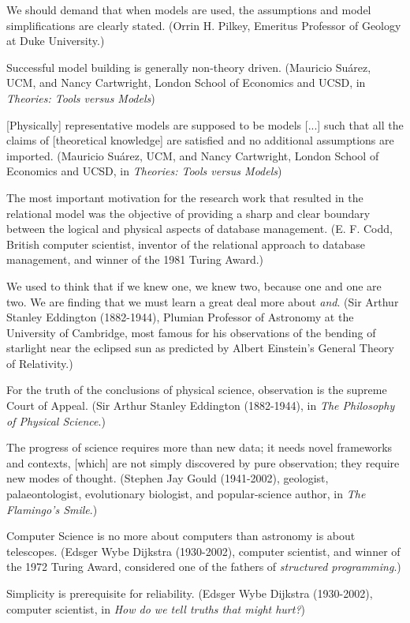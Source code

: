  We should demand that when models are used, the assumptions and
model simplifications are clearly stated. (Orrin H. Pilkey,
Emeritus Professor of Geology at Duke University.)

 Successful model building is generally non-theory driven.
(Mauricio Suárez, UCM, and Nancy Cartwright, London School of
Economics and UCSD, in \emph{Theories: Tools versus Models})

 [Physically] representative models are supposed to be models
[...] such that all the claims of [theoretical knowledge] are
satisfied and no additional assumptions are imported. (Mauricio
Suárez, UCM, and Nancy Cartwright, London School of Economics
and UCSD, in \emph{Theories: Tools versus Models})

 The most important motivation for the research work that
resulted in the relational model was the objective of providing
a sharp and clear boundary between the logical and physical
aspects of database management. (E. F. Codd, British computer
scientist, inventor of the relational approach to database
management, and winner of the 1981 Turing Award.)

 We used to think that if we knew one, we knew two, because one
and one are two. We are finding that we must learn a great deal
more about \emph{and}. (Sir Arthur Stanley Eddington
(1882-1944), Plumian Professor of Astronomy at the University of
Cambridge, most famous for his observations of the bending of
starlight near the eclipsed sun as predicted by Albert
Einstein's General Theory of Relativity.)

 For the truth of the conclusions of physical science,
observation is the supreme Court of Appeal. (Sir Arthur Stanley
Eddington (1882-1944), in \emph{The Philosophy of Physical
Science}.)

 The progress of science requires more than new data; it needs
novel frameworks and contexts, [which] are not simply discovered
by pure observation; they require new modes of thought. (Stephen
Jay Gould (1941-2002), geologist, palaeontologist, evolutionary
biologist, and popular-science author, in \emph{The Flamingo's
Smile}.)

 Computer Science is no more about computers than astronomy is
about telescopes. (Edsger Wybe Dijkstra (1930-2002), computer
scientist, and winner of the 1972 Turing Award, considered one
of the fathers of \emph{structured programming}.)

 Simplicity is prerequisite for reliability. (Edsger Wybe
Dijkstra (1930-2002), computer scientist, in \emph{How do we
tell truths that might hurt?})

